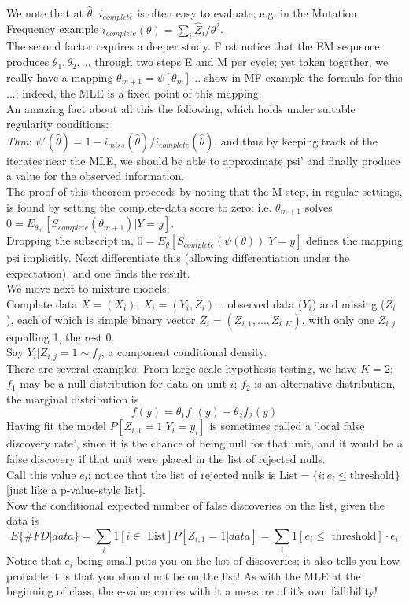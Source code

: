 \documentclass[11pt,a4paper]{article}
\begin{document}
We note that at $\hat{\theta}$, $i_{complete}$ is often easy to evaluate; e.g. in the Mutation Frequency example $i_{complete}(\theta) = \sum_i \hat{Z}_i /\theta^2$.\\
The second factor requires a deeper study.  First notice that the EM sequence produces $\theta_1, \theta_2,...$ through two steps E and M per cycle; yet taken together, we really have a mapping $\theta_{m+1} = \psi[ \theta_m ]$... show in MF example the formula for this ...; indeed, the MLE is a fixed point of this mapping.\\
An amazing fact about all this the following, which holds under suitable regularity conditions:\\
\emph{Thm}: $\psi'(\hat{ \theta} ) = 1 - i_{miss}( \hat{ \theta})/i_{complete}(\hat{ \theta} )$, and thus by keeping track of the iterates near the MLE, we should be able to approximate psi' and finally produce a value for the observed information.\\
The proof of this theorem proceeds by noting that the M step, in regular settings, is found by setting the complete-data score to zero: i.e. $\theta_{m+1}$ solves $0 = E_{\theta_m} [    S_{complete}( \theta_{m+1} ) | Y=y ]$.\\
Dropping the subscript m, $0 = E_{\theta} [ S_{complete}( \psi(\theta) )| Y= y ]$   defines the mapping psi implicitly.  Next differentiate this (allowing differentiation under the expectation), and one finds the result.\\

We move next to mixture models:\\

Complete data $X = (X_i)$;  $X_i = (Y_i,Z_i)$... observed data ($Y_i$) and missing ($Z_i$), each of which is simple binary vector $Z_i = (Z_{i,1},...,Z_{i,K})$,  with only one $Z_{i,j}$ equalling 1, the rest 0.\\
Say $Y_i | Z_{i,j} = 1  \sim f_j$, a component conditional density.\\
There are several examples.  From large-scale hypothesis testing, we have $K=2$; $f_1$ may be a null distribution for data on unit $i$; $f_2$ is an alternative distribution, the marginal distribution is
$$f(y) = \theta_1 f_1(y) + \theta_2 f_2(y)$$
Having fit the model   $P[ Z_{i,1} = 1 | Y_i = y_i ]$  is sometimes called a `local false discovery rate', since it is the chance of being null for that unit, and it would be a false discovery if that unit were placed in the list of rejected nulls.\\
Call this value $e_i$; notice that the list of rejected nulls is  $\text{List}=\{i: e_i \leq \text{threshold} \}$   [just like a p-value-style list].\\
Now the conditional expected number of false discoveries on the list, given the data is 
$$ E\{ \#FD | data \} = \sum_i 1[ i \in \text{ List} ] P[ Z_{i,1} =1 | data ]   = \sum_i 1[ e_i \leq \text{ threshold} ] \cdot  e_i$$
Notice that $e_i$  being small puts you on the list of discoveries; it also tells you how probable it is that you should not be on the list!  As with the MLE at the  beginning of class, the e-value carries with it a measure of it's own fallibility!
\end{document}
